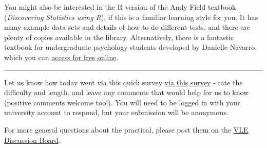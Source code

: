 \documentclass[
  a4paper,
  DIV=11,
  numbers=noendperiod]{scrreprt}
\begin{document}
You might also be interested in the R version of the Andy Field textbook
(\emph{Discovering Statistics using R}), if this is a familiar learning
style for you. It has many example data sets and details of how to do
different tests, and there are plenty of copies available in the
library. Alternatively, there is a fantastic textbook for undergraduate
psychology students developed by Danielle Navarro, which you can
\href{https://learningstatisticswithr.com/book/}{access for free
online}.

\begin{center}\rule{0.5\linewidth}{0.5pt}\end{center}

\begin{tcolorbox}[enhanced jigsaw, colbacktitle=quarto-callout-warning-color!10!white, leftrule=.75mm, breakable, colframe=quarto-callout-warning-color-frame, opacityback=0, titlerule=0mm, rightrule=.15mm, opacitybacktitle=0.6, colback=white, coltitle=black, toprule=.15mm, bottomtitle=1mm, bottomrule=.15mm, toptitle=1mm, title={How's it going?}, arc=.35mm, left=2mm]

Let us know how today went via this quick survey
\href{https://docs.google.com/forms/d/e/1FAIpQLSdxrvu8kUlKKbFLsFrLhkkWjD9GgFy4hd-kG6ds3N1A_vfCug/viewform?usp=publish-editor}{via
this survey} - rate the difficulty and length, and leave any comments
that would help for us to know (positive comments welcome too!). You
will need to be logged in with your university account to respond, but
your submission will be anonymous.

For more general questions about the practical, please post them on the
\href{https://vle.york.ac.uk/ultra/courses/_117163_1/discussion/_6581034_1?view=discussions}{VLE
Discussion Board}.

\end{tcolorbox}
\end{document}
